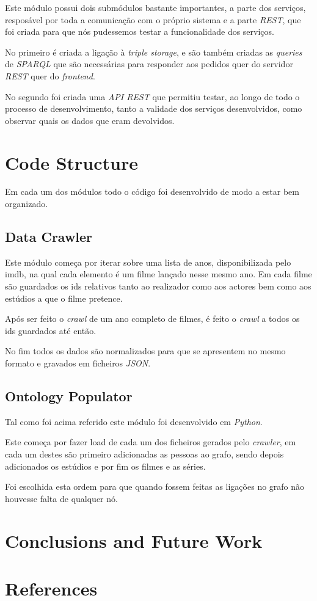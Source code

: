 \documentclass[a4paper]{article}
\begin{document}
Este módulo possui dois submódulos bastante importantes, a parte dos serviços, resposável por toda a comunicação com o próprio sistema e a parte \textit{REST}, que foi criada para que nós pudessemos testar a funcionalidade dos serviços.

No primeiro é criada a ligação à \textit{triple storage}, e são também criadas as \textit{queries} de \textit{SPARQL} que são necessárias para responder aos pedidos quer do servidor \textit{REST} quer do \textit{frontend}.

No segundo foi criada uma \textit{API REST} que permitiu testar, ao longo de todo o processo de desenvolvimento, tanto a validade dos serviços desenvolvidos, como observar quais os dados que eram devolvidos.

\section{Code Structure}
\indent \indent Em cada um dos módulos todo o código foi desenvolvido de modo a estar bem organizado.

\subsection{Data Crawler}
\indent \indent Este módulo começa por iterar sobre uma lista de anos, disponibilizada pelo imdb, na qual cada elemento é um filme lançado nesse mesmo ano. Em cada filme são guardados os ids relativos tanto ao realizador como aos actores bem como aos estúdios a que o filme pretence.

Após ser feito o \textit{crawl} de um ano completo de filmes, é feito o \textit{crawl} a todos os ids guardados até então.

No fim todos os dados são normalizados para que se apresentem no mesmo formato e gravados em ficheiros \textit{JSON}.

\subsection{Ontology Populator}
\indent \indent Tal como foi acima referido este módulo foi desenvolvido em \textit{Python}. 

Este começa por fazer load de cada um dos ficheiros gerados pelo \textit{crawler}, em cada um destes são primeiro adicionadas as pessoas ao grafo, sendo depois adicionados os estúdios e por fim os filmes e as séries.

Foi escolhida esta ordem para que quando fossem feitas as ligações no grafo não houvesse falta de qualquer nó.

\section{Conclusions and Future Work}
\indent \indent

\section{References}
\indent \indent
\end{document}
